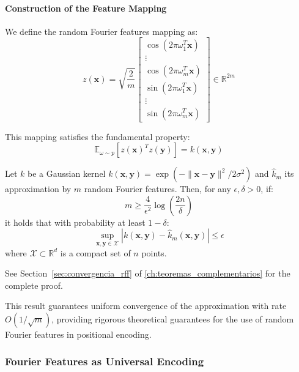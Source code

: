 \paragraph{Construction of the Feature Mapping}

We define the random Fourier features mapping as:
\begin{equation}
z(\mathbf{x}) = \sqrt{\frac{2}{m}} \begin{bmatrix} \cos(2\pi \omega_1^T \mathbf{x}) \\ \vdots \\ \cos(2\pi \omega_m^T \mathbf{x}) \\ \sin(2\pi \omega_1^T \mathbf{x}) \\ \vdots \\ \sin(2\pi \omega_m^T \mathbf{x}) \end{bmatrix} \in \mathbb{R}^{2m}
\end{equation}

This mapping satisfies the fundamental property:
\begin{equation}
\mathbb{E}_{\omega \sim p}[z(\mathbf{x})^T z(\mathbf{y})] = k(\mathbf{x}, \mathbf{y})
\end{equation}

\begin{theorem}
Let $k$ be a Gaussian kernel $k(\mathbf{x}, \mathbf{y}) = \exp(-\|\mathbf{x} - \mathbf{y}\|^2 / 2\sigma^2)$ and $\hat{k}_m$ its approximation by $m$ random Fourier features. Then, for any $\epsilon, \delta > 0$, if:
\begin{equation}
m \geq \frac{4}{\epsilon^2} \log\left(\frac{2n}{\delta}\right)
\end{equation}
it holds that with probability at least $1 - \delta$:
\begin{equation}
\sup_{\mathbf{x}, \mathbf{y} \in \mathcal{X}} |k(\mathbf{x}, \mathbf{y}) - \hat{k}_m(\mathbf{x}, \mathbf{y})| \leq \epsilon
\end{equation}
where $\mathcal{X} \subset \mathbb{R}^d$ is a compact set of $n$ points.

See Section~\ref{sec:convergencia_rff} of \autoref{ch:teoremas_complementarios} for the complete proof.
\end{theorem}

This result guarantees uniform convergence of the approximation with rate $O(1/\sqrt{m})$, providing rigorous theoretical guarantees for the use of random Fourier features in positional encoding.

\subsubsection{Fourier Features as Universal Encoding}

